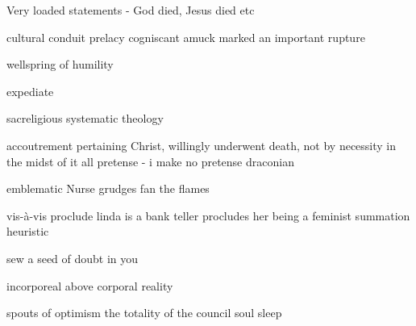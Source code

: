 Very loaded statements - God died, Jesus died etc


cultural conduit
prelacy
cogniscant
amuck
marked an important rupture

wellspring of humility

expediate

sacreligious
systematic theology


accoutrement
pertaining
Christ, willingly underwent death, not by necessity
in the midst of it all
pretense - i make no pretense
draconian

emblematic
Nurse grudges
fan the flames

vis-à-vis
proclude
linda is a bank teller procludes her being a feminist
summation
heuristic

sew a seed of doubt in you

incorporeal above corporal reality

spouts of optimism
the totality of the council
soul sleep

